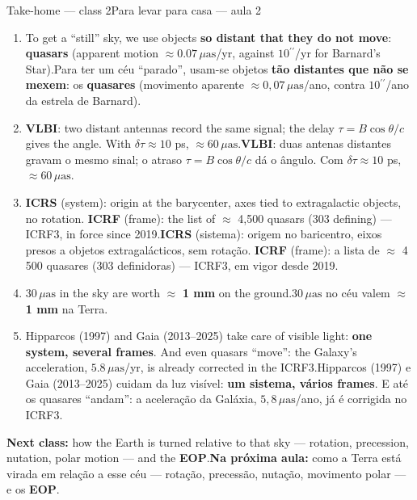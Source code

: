 \documentclass[aspectratio=169,11pt]{beamer}
\newcommand{\tr}[2]{\ifEN#2\else#1\fi}
\newcommand{\bnum}[1]{\textbf{\textcolor{mTeal}{#1}}}
\newcommand{\sist}[1]{\textcolor{corSist}{\textbf{#1}}}
\newcommand{\fram}[1]{\textcolor{corFrame}{\textbf{#1}}}
\newcommand{\asec}{\ensuremath{{}^{\prime\prime}}}
\newcommand{\uas}{\ensuremath{\,\mu\mathrm{as}}\xspace}
\begin{document}
\begin{frame}{\tr{Para levar para casa --- aula 2}{Take-home --- class 2}}
  \footnotesize
  \begin{enumerate}
    \setlength{\itemsep}{2pt}
    \item \tr{Para ter um céu ``parado'', usam-se objetos \bnum{tão distantes que não se mexem}:
          os \bnum{quasares} (movimento aparente $\approx 0{,}07\uas$/ano, contra $10\asec$/ano da
          estrela de Barnard).}{To get a ``still'' sky, we use objects \bnum{so distant that they do
          not move}: \bnum{quasars} (apparent motion $\approx 0.07\uas$/yr, against $10\asec$/yr for
          Barnard's Star).}
    \item \tr{\bnum{VLBI}: duas antenas distantes gravam o mesmo sinal; o atraso $\tau = B\cos\theta/c$
          dá o ângulo. Com $\delta\tau \approx 10$ ps, $\approx 60\uas$.}{\bnum{VLBI}: two distant
          antennas record the same signal; the delay $\tau = B\cos\theta/c$ gives the angle. With
          $\delta\tau \approx 10$ ps, $\approx 60\uas$.}
    \item \tr{\sist{ICRS} (sistema): origem no baricentro, eixos presos a objetos extragalácticos,
          sem rotação. \fram{ICRF} (frame): a lista de $\approx$ 4\,500 quasares ($303$
          definidoras) --- ICRF3, em vigor desde 2019.}{\sist{ICRS} (system): origin at the
          barycenter, axes tied to extragalactic objects, no rotation. \fram{ICRF} (frame): the list
          of $\approx$ 4,500 quasars ($303$ defining) --- ICRF3, in force since 2019.}
    \item \tr{$30\uas$ no céu valem $\approx$ \bnum{1 mm} na Terra.}{$30\uas$ in the sky are worth
          $\approx$ \bnum{1 mm} on the ground.}
    \item \tr{Hipparcos (1997) e Gaia (2013--2025) cuidam da luz visível: \bnum{um sistema, vários
          frames}. E até os quasares ``andam'': a aceleração da Galáxia, $5{,}8\uas$/ano, já é
          corrigida no ICRF3.}{Hipparcos (1997) and Gaia (2013--2025) take care of visible light:
          \bnum{one system, several frames}. And even quasars ``move'': the Galaxy's acceleration,
          $5.8\uas$/yr, is already corrected in the ICRF3.}
  \end{enumerate}
  \begin{ideia}
    \scriptsize \tr{\textbf{Na próxima aula:} como a Terra está virada em relação a esse céu ---
    rotação, precessão, nutação, movimento polar --- e os \bnum{EOP}.}{\textbf{Next class:} how
    the Earth is turned relative to that sky --- rotation, precession, nutation, polar motion ---
    and the \bnum{EOP}.}
  \end{ideia}
\end{frame}
\end{document}
